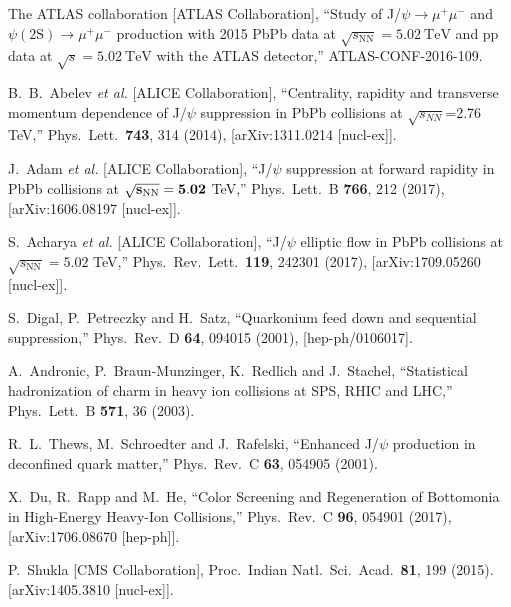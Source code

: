 \documentclass[12pt,a4paper,final]{iopart} %
\begin{document}
\begin{thebibliography}{100}
  The ATLAS collaboration [ATLAS Collaboration],
  ``Study of J/$\psi\to\mu^+\mu^-$ and $\psi\mathrm{(2S)}\to\mu^+\mu^-$ production with 2015 PbPb data at 
  $\sqrt{s_{\mathrm{NN}}} = 5.02~\mathrm {TeV}$ and pp data at $\sqrt{s} = 5.02~\mathrm {TeV}$ with the 
  ATLAS detector,'' ATLAS-CONF-2016-109.

  B.~B.~Abelev {\it et al.}  [ALICE Collaboration],
  ``Centrality, rapidity and transverse momentum dependence of J/$\psi$ suppression in PbPb collisions at $\sqrt{s_{NN}}$=2.76 TeV,''
  Phys.\ Lett.\  {\bf 743}, 314 (2014), [arXiv:1311.0214 [nucl-ex]].


  J.~Adam {\it et al.} [ALICE Collaboration],
  ``J/$\psi$ suppression at forward rapidity in PbPb collisions at $\mathbf{\sqrt{s_{{\rm NN}}} = 5.02}$ TeV,''
  Phys.\ Lett.\ B {\bf 766}, 212 (2017), [arXiv:1606.08197 [nucl-ex]].


  S.~Acharya {\it et al.} [ALICE Collaboration],
  ``J/$\psi$ elliptic flow in PbPb collisions at $\sqrt{s_\mathrm{NN}}=5.02$ TeV,''
  Phys.\ Rev.\ Lett.\  {\bf 119}, 242301 (2017),
  [arXiv:1709.05260 [nucl-ex]].


  S.~Digal, P.~Petreczky and H.~Satz,
  ``Quarkonium feed down and sequential suppression,''
  Phys.\ Rev.\ D {\bf 64}, 094015 (2001), [hep-ph/0106017].

  A.~Andronic, P.~Braun-Munzinger, K.~Redlich and J.~Stachel,
  ``Statistical hadronization of charm in heavy ion collisions at SPS, RHIC and LHC,''
  Phys.\ Lett.\ B {\bf 571}, 36 (2003).


  R.~L.~Thews, M.~Schroedter and J.~Rafelski,
  ``Enhanced J/$\psi$ production in deconfined quark matter,''
  Phys.\ Rev.\ C {\bf 63}, 054905 (2001).



  X.~Du, R.~Rapp and M.~He,
  ``Color Screening and Regeneration of Bottomonia in High-Energy Heavy-Ion Collisions,''
  Phys.\ Rev.\ C {\bf 96}, 054901 (2017), [arXiv:1706.08670 [hep-ph]].






  
  P.~Shukla [CMS Collaboration],
  Proc.\ Indian Natl.\ Sci.\ Acad.\  {\bf 81}, 199 (2015).
  [arXiv:1405.3810 [nucl-ex]].



\end{thebibliography}
\end{document}
